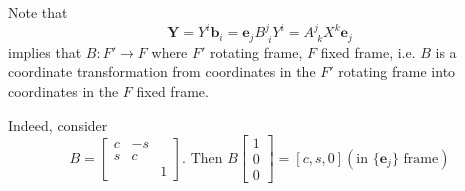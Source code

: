 \documentclass[10pt]{amsart}
\begin{document}
\begin{multicols*}{2}
Note that 
\begin{equation}
	\mathbf{Y} = Y^i \mathbf{b}_i = \mathbf{e}_j B^j_{\, \, i} Y^i = A^j_{\, \, k} X^k \mathbf{e}_j 
\end{equation}
implies that $B: F' \to F$ where $F'$ rotating frame, $F$ fixed frame, i.e. $B$ is a coordinate transformation from coordinates in the $F'$ rotating frame into coordinates in the $F$ fixed frame.

Indeed, consider 
\[
B = \left[ \begin{matrix} c & -s & \\ s & c & \\ & & 1 \end{matrix} \right]. \text{ Then } B \left[ \begin{matrix} 1 \\ 0 \\ 0 \end{matrix} \right] = [c, s, 0] (\text{in $\lbrace \mathbf{e}_j \rbrace$ frame})
\]






\end{multicols*}
\end{document}
